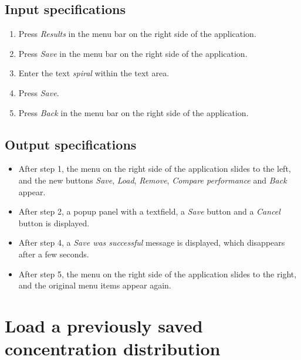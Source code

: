 \subsection*{Input specifications}
\begin{enumerate}
\item Press \emph{Results} in the menu bar on the right side of the application.
\item Press \emph{Save} in the menu bar on the right side of the application.
\item Enter the text \emph{spiral} within the text area.
\item Press \emph{Save}.
\item Press \emph{Back} in the menu bar on the right side of the application.
\end{enumerate}

\subsection*{Output specifications}
\begin{itemize}
\item After step 1, the menu on the right side of the application slides to the left, and the new buttons \emph{Save}, \emph{Load}, \emph{Remove}, \emph{Compare performance} and \emph{Back} appear.
\item After step 2, a popup panel with a textfield, a \emph{Save} button and a \emph{Cancel} button is displayed.
\item After step 4, a \emph{Save was successful} message is displayed, which disappears after a few seconds.
\item After step 5, the menu on the right side of the application slides to the right, and the original menu items appear again.
\end{itemize}

\section{Load a previously saved concentration distribution}

